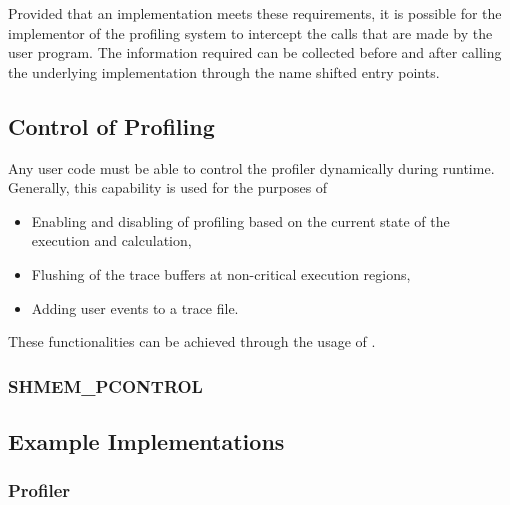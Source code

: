 Provided that an \openshmem implementation meets these requirements, 
it is possible for the implementor of the profiling system 
to intercept the \openshmem calls that are made by the user 
program. The information required can be collected before and after 
calling the underlying \openshmem implementation through the name 
shifted entry points. 

\subsection{Control of Profiling}
\label{sec:pshmem_control_profile}
Any user code must be able to control the profiler dynamically 
during runtime. Generally, this capability is used for the 
purposes of

\begin{itemize}
\item Enabling and disabling of profiling based on the current 
state of the execution and calculation,
\item Flushing of the trace buffers at non-critical execution 
regions,
\item Adding user events to a trace file.
\end{itemize}

These functionalities can be achieved through the usage of 
.

\subsubsection{\textbf{SHMEM\_PCONTROL}}\label{subsec:shmem_pcontrol}




\subsection{Example Implementations}
\label{sec:pshmem_example_implementations}

\subsubsection{Profiler}
\label{sec:pshmem_example_profiler}


